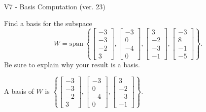 \begin{exercise}
  \begin{exerciseTitle}V7 - Basis Computation (ver. 23)\end{exerciseTitle}
  \begin{exerciseStatement}
    Find a basis for the subspace 
\[W=\mathrm{span}\ \left\{\left[\begin{array}{r}
-3 \\
-3 \\
-2 \\
3
\end{array}\right] , \left[\begin{array}{r}
-3 \\
0 \\
-4 \\
0
\end{array}\right] , \left[\begin{array}{r}
3 \\
-2 \\
-3 \\
-1
\end{array}\right] , \left[\begin{array}{r}
-3 \\
8 \\
-1 \\
-5
\end{array}\right]\right\}.\]
 Be sure to explain why your result is a basis.


  \end{exerciseStatement}
  \begin{exerciseAnswer}
   A basis of \(W\) is  \(\left\{\left[\begin{array}{r}
-3 \\
-3 \\
-2 \\
3
\end{array}\right] , \left[\begin{array}{r}
-3 \\
0 \\
-4 \\
0
\end{array}\right] , \left[\begin{array}{r}
3 \\
-2 \\
-3 \\
-1
\end{array}\right]\right\}\).
  


  \end{exerciseAnswer}
\end{exercise}